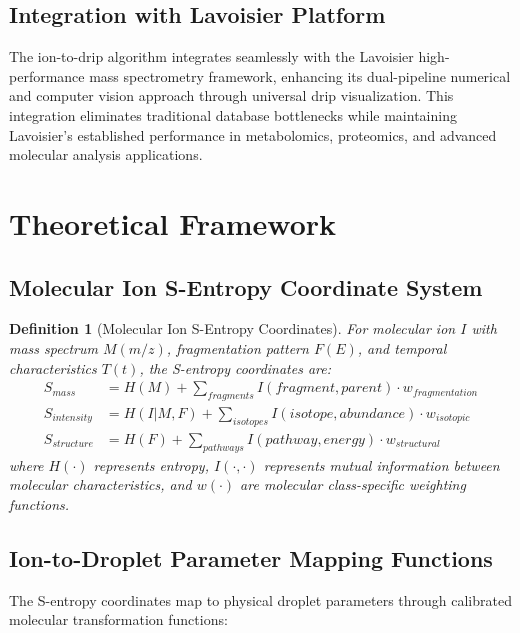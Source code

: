 \documentclass[12pt,a4paper]{article}
\newtheorem{definition}{Definition}
\begin{document}
\subsection{Integration with Lavoisier Platform}

The ion-to-drip algorithm integrates seamlessly with the Lavoisier high-performance mass spectrometry framework, enhancing its dual-pipeline numerical and computer vision approach through universal drip visualization. This integration eliminates traditional database bottlenecks while maintaining Lavoisier's established performance in metabolomics, proteomics, and advanced molecular analysis applications.

\section{Theoretical Framework}

\subsection{Molecular Ion S-Entropy Coordinate System}

\begin{definition}[Molecular Ion S-Entropy Coordinates]
For molecular ion $I$ with mass spectrum $M(m/z)$, fragmentation pattern $F(E)$, and temporal characteristics $T(t)$, the S-entropy coordinates are:
\begin{align}
S_{mass} &= H(M) + \sum_{fragments} I(fragment, parent) \cdot w_{fragmentation} \\
S_{intensity} &= H(I|M,F) + \sum_{isotopes} I(isotope, abundance) \cdot w_{isotopic} \\
S_{structure} &= H(F) + \sum_{pathways} I(pathway, energy) \cdot w_{structural}
\end{align}
where $H(\cdot)$ represents entropy, $I(\cdot,\cdot)$ represents mutual information between molecular characteristics, and $w(\cdot)$ are molecular class-specific weighting functions.
\end{definition}

\subsection{Ion-to-Droplet Parameter Mapping Functions}

The S-entropy coordinates map to physical droplet parameters through calibrated molecular transformation functions:
\end{document}
